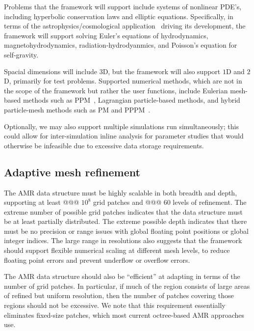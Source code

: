 \documentclass[10pt,twocolumn]{article}
\begin{document}
Problems that the framework will support include systems of nonlinear
PDE's, including hyperbolic conservation laws and elliptic equations.
Specifically, in terms of the astrophysics/cosmological application
\enzoii\ driving its development, the framework will support solving
Euler's equations of hydrodynamics, magnetohydrodynamics,
radiation-hydrodyanmics, and Poisson's equation for self-gravity.

Spacial dimensions will include $3$D, but the framework will also
support $1$D and $2$D, primarily for test problems.  Supported
numerical methods, which are not in the scope of the framework but
rather the user functions, include Eulerian mesh-based methods such as
PPM~\cite{WoCo84b}, Lagrangian particle-based methods, and hybrid
particle-mesh methods such as PM and PPPM~\cite{HoEa88}.

Optionally, we may also support multiple simulations run
simultaneously; this could allow for inter-simulation inline analysis
for parameter studies that would otherwise be infeasible due to
excessive data storage requirements.


\subsection{Adaptive mesh refinement} \label{ss:require-amr}

The AMR data structure must be highly scalable in both breadth and
depth, supporting at least @@@ $10^8$ grid patches and @@@ $60$ levels
of refinement.  The extreme number of possible grid patches indicates
that the data structure must be at least partially distributed.  The
extreme possible depth indicates that there must be no precision or
range issues with global floating point positions or global integer
indices.  The large range in resolutions also suggests that the
framework should support flexible numerical scaling at different mesh
levels, to reduce floating point errors and prevent underflow or
overflow errors.

The AMR data structure should also be ``efficient'' at adapting in
terms of the number of grid patches.  In particular, if much of the
region consists of large areas of refined but uniform resolution, then
the number of patches covering those regions should not be excessive.
We note that this requirement essentially eliminates fixed-size
patches, which most current octree-based AMR approaches use.
\end{document}
